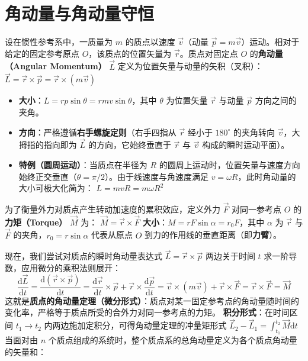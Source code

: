 
\section{角动量与角动量守恒}

\begin{definition}[质点对定点的角动量和力矩]\label{def:angular-momentum}
设在惯性参考系中，一质量为 $m$ 的质点以速度 $\vec{v}$（动量 $\vec{p} = m\vec{v}$）运动。相对于给定的固定参考原点 $O$，该质点的位置矢量为 $\vec{r}$。质点对固定点 $O$ 的\textbf{角动量（Angular Momentum）} $\vec{L}$ 定义为位置矢量与动量的矢积（叉积）：
 \(\vec{L} = \vec{r} \times \vec{p} = \vec{r} \times (m\vec{v})\) 
\begin{itemize}
\item \textbf{大小}：$L = rp\sin\theta = rmv\sin\theta$，其中 $\theta$ 为位置矢量 $\vec{r}$ 与动量 $\vec{p}$ 方向之间的夹角。
\item \textbf{方向}：严格遵循\textbf{右手螺旋定则}（右手四指从 $\vec{r}$ 经小于 $180^\circ$ 的夹角转向 $\vec{v}$，大拇指的指向即为 $\vec{L}$ 的方向，它始终垂直于 $\vec{r}$ 与 $\vec{v}$ 构成的瞬时运动平面）。
\item \textbf{特例（圆周运动）}：当质点在半径为 $R$ 的圆周上运动时，位置矢量与速度方向始终正交垂直（$\theta = \pi/2$）。由于线速度与角速度满足 $v = \omega R$，此时角动量的大小可极大化简为：
 \(L = mvR = m\omega R^2\) 
\end{itemize}
为了衡量外力对质点产生转动加速度的累积效应，定义外力 $\vec{F}$ 对同一参考点 $O$ 的\textbf{力矩（Torque）} $\vec{M}$ 为：
 \(\vec{M} = \vec{r} \times \vec{F}\) 
\textbf{大小}：$M = rF\sin\alpha = r_0 F$，其中 $\alpha$ 为 $\vec{r}$ 与 $\vec{F}$ 的夹角，$r_0 = r\sin\alpha$ 代表从原点 $O$ 到力的作用线的垂直距离（即\textbf{力臂}）。
\end{definition}
现在，我们尝试对质点的瞬时角动量表达式 $\vec{L} = \vec{r} \times \vec{p}$ 两边关于时间 $t$ 求一阶导数，应用微分的乘积法则展开：
\[
\frac{\mathrm{d}\vec{L}}{\mathrm{d}t} = \frac{\mathrm{d}(\vec{r} \times \vec{p})}{\mathrm{d}t} = \frac{\mathrm{d}\vec{r}}{\mathrm{d}t} \times \vec{p} + \vec{r} \times \frac{\mathrm{d}\vec{p}}{\mathrm{d}t}= \vec{v} \times (m\vec{v})+ \vec{r} \times \vec{F} = \vec{r} \times \vec{F}=\vec{M}
\]
这就是\textbf{质点的角动量定理（微分形式）}：质点对某一固定参考点的角动量随时间的变化率，严格等于质点所受的合外力对同一参考点的力矩。
\textbf{积分形式}：在时间区间 $t_1 \to t_2$ 内两边施加定积分，可得角动量定理的冲量矩形式 \(\vec{L}_2 - \vec{L}_1 = \int_{t_1}^{t_2} \vec{M}\mathrm{d}t\) 
当面对由 $n$ 个质点组成的系统时，整个质点系的总角动量定义为各个质点角动量的矢量和：
